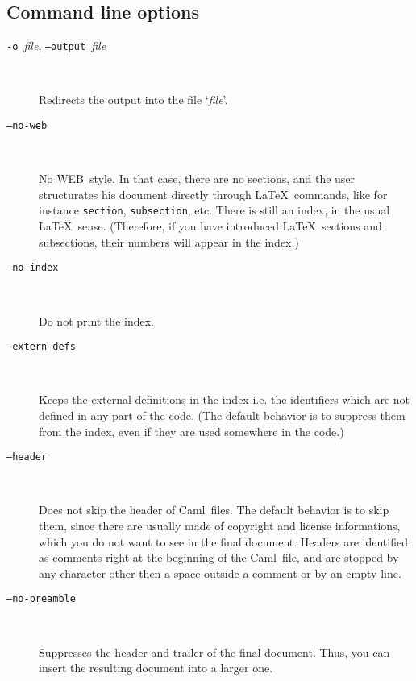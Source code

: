 \documentclass[12pt]{article}
\newcommand{\WEB}{\textsf{WEB}}
\newcommand{\Caml}{\textsf{Caml}}
\begin{document}
\subsection*{Command line options}

\begin{description}

\item[\texttt{-o }\textit{file}, \texttt{--output }\textit{file}] ~\par
  
  Redirects the output into the file `\textit{file}'.

\item[\texttt{--no-web}] ~\par

  No \WEB\ style. In that case, there are no sections, and the user
  structurates his document directly through \LaTeX\ commands, like
  for instance \texttt{section},
  \texttt{subsection}, etc.
  There is still an index, in the usual \LaTeX\ sense. (Therefore, if
  you have introduced \LaTeX\ sections and subsections, their numbers
  will appear in the index.)

\item[\texttt{--no-index}] ~\par
  
  Do not print the index.

\item[\texttt{--extern-defs}] ~\par

  Keeps the external definitions in the index i.e. the identifiers
  which are not defined in any part of the code. (The default behavior
  is to suppress them from the index, even if they are used somewhere
  in the code.)

\item[\texttt{--header}] ~\par

  Does not skip the header of \Caml\ files. The default behavior is to
  skip them, since there are usually made of copyright and license
  informations, which you do not want to see in the final document.
  Headers are identified as comments right at the beginning of the
  \Caml\ file, and are stopped by any character other then a space
  outside a comment or by an empty line. 

\item[\texttt{--no-preamble}] ~\par

  Suppresses the header and trailer of the final document. Thus, you can
  insert the resulting document into a larger one.


\end{description}
\end{document}
